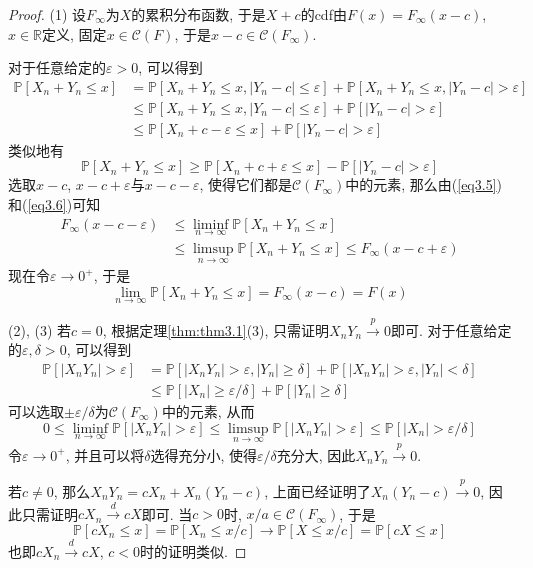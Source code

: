 \documentclass[cn, 12pt, math=mtpro2, bibstyle=apa, blue, twocol]{elegantbook}
\newcommand{\R}{\mathbb{R}}
\newcommand{\PP}{\mathbb{P}}
\newcommand{\limn}{\lim_{n\to\infty}}
\begin{document}
\begin{proof}
  (1) 设$F_\infty$为$X$的累积分布函数, 于是$X+c$的cdf由$F(x)=F_\infty(x-c)$, $x\in\R$定义, 固定$x\in\mathscr{C}(F)$, 于是$x-c\in\mathscr{C}(F_\infty)$.

  对于任意给定的$\varepsilon>0$, 可以得到
  \begin{align}
  \PP[X_n+Y_n\leq x]&=\PP[X_n+Y_n\leq x, |Y_n-c|\leq\varepsilon]+\PP[X_n+Y_n\leq x, |Y_n-c|>\varepsilon] \nonumber \\
  &\leq \PP[X_n+Y_n\leq x, |Y_n-c|\leq\varepsilon]+\PP[|Y_n-c|>\varepsilon] \nonumber \\
  &\leq \PP[X_n+c-\varepsilon\leq x]+\PP[|Y_n-c|>\varepsilon] \label{eq3.5}
  \end{align}
  类似地有
  \begin{equation}\label{eq3.6}
    \PP[X_n+Y_n\leq x]\geq \PP[X_n+c+\varepsilon\leq x]-\PP[|Y_n-c|>\varepsilon]
  \end{equation}
  选取$x-c$, $x-c+\varepsilon$与$x-c-\varepsilon$, 使得它们都是$\mathscr{C}(F_\infty)$中的元素, 那么由(\ref{eq3.5})和(\ref{eq3.6})可知
  \begin{align*}
  F_\infty(x-c-\varepsilon)&\leq\liminf_{n\to\infty}\PP[X_n+Y_n\leq x] \\
  &\leq\limsup_{n\to\infty}\PP[X_n+Y_n\leq x]\leq F_\infty(x-c+\varepsilon)
  \end{align*}
  现在令$\varepsilon\to0^+$, 于是
  $$\limn \PP[X_n+Y_n\leq x]=F_\infty(x-c)=F(x)$$

  (2), (3) 若$c=0$, 根据定理\ref{thm:thm3.1}(3), 只需证明$X_nY_n\xrightarrow{p}0$即可. 对于任意给定的$\varepsilon, \delta>0$, 可以得到
  \begin{align*}
  \PP[|X_nY_n|>\varepsilon]&=\PP[|X_nY_n|>\varepsilon, |Y_n|\geq\delta]+\PP[|X_nY_n|>\varepsilon, |Y_n|<\delta] \\
  &\leq \PP[|X_n|\geq\varepsilon/\delta]+\PP[|Y_n|\geq\delta]
  \end{align*}
  可以选取$\pm\varepsilon/\delta$为$\mathscr{C}(F_\infty)$中的元素, 从而
  $$0\leq\liminf_{n\to\infty}\PP[|X_nY_n|>\varepsilon]\leq\limsup_{n\to\infty}\PP[|X_nY_n|>\varepsilon]\leq \PP[|X_n|>\varepsilon/\delta]$$
  令$\varepsilon\to0^+$, 并且可以将$\delta$选得充分小, 使得$\varepsilon/\delta$充分大, 因此$X_nY_n\xrightarrow{p}0$.

  若$c\neq0$, 那么$X_nY_n=cX_n+X_n(Y_n-c)$, 上面已经证明了$X_n(Y_n-c)\xrightarrow{p}0$, 因此只需证明$cX_n\xrightarrow{d}cX$即可. 当$c>0$时, $x/a\in\mathscr{C}(F_\infty)$, 于是
  $$\PP[cX_n\leq x]=\PP[X_n\leq x/c]\to \PP[X\leq x/c]=\PP[cX\leq x]$$
  也即$cX_n\xrightarrow{d}cX$, $c<0$时的证明类似.
\end{proof}
\end{document}
